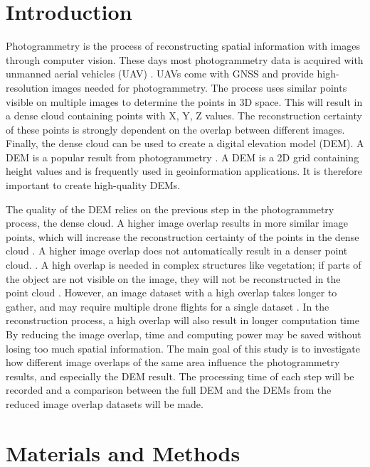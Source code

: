 \documentclass{isprs} %
\begin{document}
\section{Introduction}\label{Introduction}
Photogrammetry is the process of reconstructing spatial information with images through computer vision. 
These days most photogrammetry data is acquired with unmanned aerial vehicles (UAV) \citep{UAVAreMoreUsed}. 
UAVs come with GNSS and provide high-resolution images needed for photogrammetry.
The process uses similar points visible on multiple images to determine the points in 3D space.
This will result in a dense cloud containing points with X, Y, Z values.
The reconstruction certainty of these points is strongly dependent on the overlap between different images.
Finally, the dense cloud can be used to create a digital elevation model (DEM).
A DEM is a popular result from photogrammetry \citep{DemIncrease1}.
A DEM is a 2D grid containing height values and is frequently used in geoinformation applications.
It is therefore important to create high-quality DEMs.

The quality of the DEM relies on the previous step in the photogrammetry process, the dense cloud.
A higher image overlap results in more similar image points, which will increase the reconstruction certainty of the points in the dense cloud \citep{MoreOverMoreAcc}.
A higher image overlap does not automatically result in a denser point cloud. \citep{EffectofUABimgcamover}. 
A high overlap is needed in complex structures like vegetation; if parts of the object are not visible on the image, they will not be reconstructed in the point cloud \citep{AccessingImageOverlap}.
However, an image dataset with a high overlap takes longer to gather, and may require multiple drone flights for a single dataset \citep{rosnell2012point}.
In the reconstruction process, a high overlap will also result in longer computation time \citep{AccessingImageOverlap}
By reducing the image overlap, time and computing power may be saved without losing too much spatial information.
The main goal of this study is to investigate how different image overlaps of the same area influence the photogrammetry results, and especially the DEM result.
The processing time of each step will be recorded and a comparison between the full DEM and the DEMs from the reduced image overlap datasets will be made.

\section{Materials and Methods}
\end{document}
